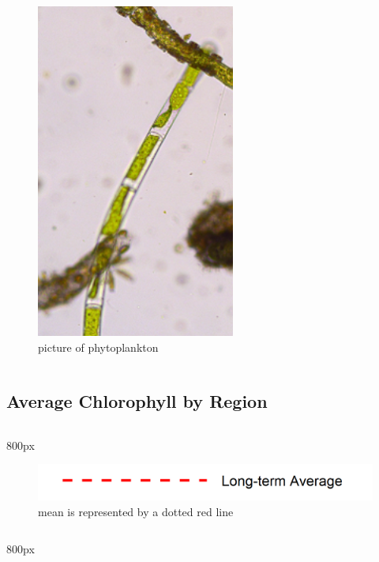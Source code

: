 \documentclass[
]{book}
\begin{document}
\begin{column}{0.3\textwidth}
\begin{figure}

{\centering \includegraphics[width=2.57in]{figures/phyto} 

}

\caption{picture of phytoplankton}\label{fig:unnamed-chunk-18}
\end{figure}
\end{column}

\hypertarget{average-chlorophyll-by-region}{%
\subsection{Average Chlorophyll by Region}\label{average-chlorophyll-by-region}}

\begin{column}{800px\textwidth}
\begin{figure}
\includegraphics[width=15.25in]{figures/mline} \caption{mean is represented by a dotted red line}\label{fig:unnamed-chunk-19}
\end{figure}
\end{column}

\begin{column}{800px\textwidth}
\end{column}
\end{document}
